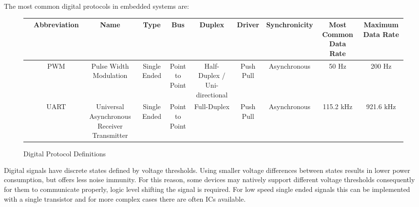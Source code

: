 \documentclass[main.tex]{subfiles}
\begin{document}
The most common digital protocols in embedded systems are:
\begin{figure}[h!]
    \centering
    \begin{tabular}{|c|c|c|c|c|c|c|c|c|c|}
        \hline 
        & Abbreviation & Name & Type & Bus & Duplex & Driver & Synchronicity & Most Common Data Rate & Maximum Data Rate \\ \hline
        & PWM & Pulse Width Modulation & Single Ended & Point to Point & Half-Duplex / Uni-directional & Push Pull & Asynchronous & 50 Hz & 200 Hz \\ \hline
        & UART & Universal Asynchronous Receiver Transmitter & Single Ended & Point to Point & Full-Duplex & Push Pull & Asynchronous & 115.2 kHz & 921.6 kHz \\ \hline

    \end{tabular}
    \caption{Digital Protocol Definitions}
    \label{fig:digital_protocols}
\end{figure}

Digital signals have discrete states defined by voltage thresholds. Using smaller voltage differences between states results in lower power consumption, but offers less noise immunity. For this reason, some devices may natively support different voltage thresholds consequently for them to communicate properly, logic level shifting the signal is required. For low speed single ended signals this can be implemented with a single transistor and for more complex cases there are often ICs available. 

\end{document}
